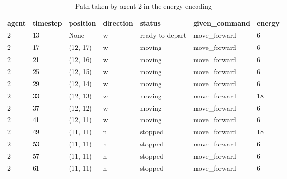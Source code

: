 \documentclass[12pt, a4paper]{llncs}
\begin{document}
\begin{table}[htbp]
  \centering
  \caption{Path taken by agent 2 in the energy encoding}
  \label{tab:energy2}
  \begin{tabular}{lllllll}
    \toprule
    agent & timestep & position & direction & status & given\_command & energy \\
    \midrule
2 & 13 & None & w & ready to depart & move\_forward & 6 \\
2 & 17 & (12, 17) & w & moving & move\_forward & 6 \\
2 & 21 & (12, 16) & w & moving & move\_forward & 6 \\
2 & 25 & (12, 15) & w & moving & move\_forward & 6 \\
2 & 29 & (12, 14) & w & moving & move\_forward & 6 \\
2 & 33 & (12, 13) & w & moving & move\_forward & 18 \\
2 & 37 & (12, 12) & w & moving & move\_forward & 6 \\
2 & 41 & (12, 11) & w & moving & move\_forward & 6 \\
2 & 49 & (11, 11) & n & stopped & move\_forward & 18 \\
2 & 53 & (11, 11) & n & stopped & move\_forward & 6 \\
2 & 57 & (11, 11) & n & stopped & move\_forward & 6 \\
2 & 61 & (11, 11) & n & stopped & move\_forward & 6 \\
    \bottomrule
  \end{tabular}
\end{table}
\end{document}
